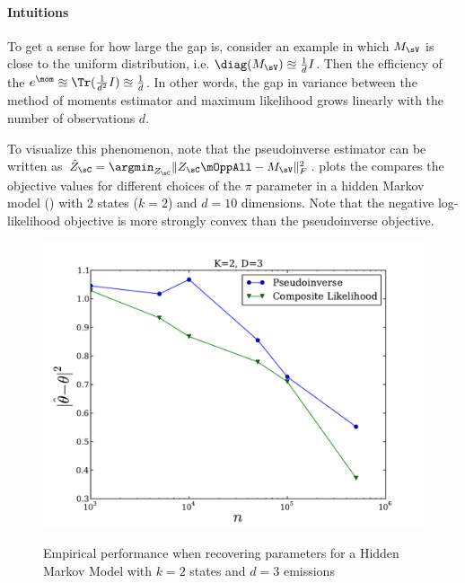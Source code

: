 \paragraph{Intuitions}
To get a sense for how large the gap is, consider an example in which
$M_\sV$ is close to the uniform distribution, i.e. $\diag(M_\sV)
  \approxeq \frac{1}{d} I$. 
Then the efficiency of the $e^\mom \approxeq \Tr(\frac{1}{d^2} I)
  \approxeq \frac{1}{d}$.
In other words, the gap in variance between the method of moments
  estimator and maximum likelihood grows linearly with the number of observations $d$.

To visualize this phenomenon, note that the pseudoinverse estimator can be written
as $\hat Z_\sC = \argmin_{Z_\sC} \|Z_\sC \mOppAll - M_\sV \|_F^2$.
 plots the compares the objective values for
different choices of the $\pi$ parameter in a hidden Markov model
() with 2 states ($k=2$) and $d=10$ dimensions.
Note that the negative log-likelihood objective is more
strongly convex than the pseudoinverse objective.

\begin{figure}
  \centering
  \includegraphics[width=\columnwidth]{figures/hmm-2-3.pdf}
    \label{fig:cl-hmm}
  \caption{Empirical performance when recovering parameters for a Hidden Markov Model with $k=2$ states and $d=3$ emissions}
\end{figure}
